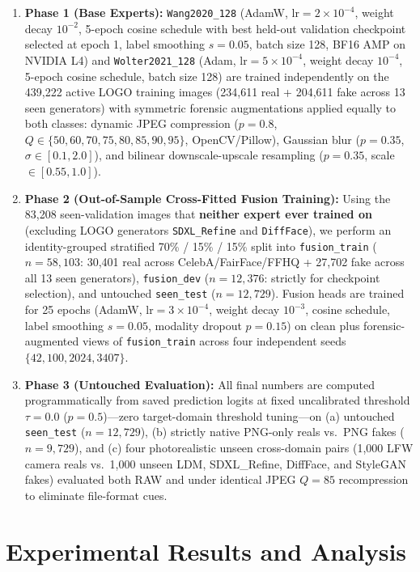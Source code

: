 \documentclass[fleqn,10pt]{wlscirep}
\begin{document}
\begin{enumerate}
    \item \textbf{Phase 1 (Base Experts):} \texttt{Wang2020\_128} (AdamW, $\text{lr}=2\times 10^{-4}$, weight decay $10^{-2}$, 5-epoch cosine schedule with best held-out validation checkpoint selected at epoch 1, label smoothing $s=0.05$, batch size 128, BF16 AMP on NVIDIA L4) and \texttt{Wolter2021\_128} (Adam, $\text{lr}=5\times 10^{-4}$, weight decay $10^{-4}$, 5-epoch cosine schedule, batch size 128) are trained independently on the 439,222 active LOGO training images (234,611 real + 204,611 fake across 13 seen generators) with symmetric forensic augmentations applied equally to both classes: dynamic JPEG compression ($p=0.8$, $Q\in\{50,60,70,75,80,85,90,95\}$, OpenCV/Pillow), Gaussian blur ($p=0.35$, $\sigma\in[0.1,2.0]$), and bilinear downscale-upscale resampling ($p=0.35$, scale $\in[0.55,1.0]$).
    \item \textbf{Phase 2 (Out-of-Sample Cross-Fitted Fusion Training):} Using the 83,208 seen-validation images that \textbf{neither expert ever trained on} (excluding LOGO generators \texttt{SDXL\_Refine} and \texttt{DiffFace}), we perform an identity-grouped stratified 70\% / 15\% / 15\% split into \texttt{fusion\_train} ($n=58,103$: 30,401 real across CelebA/FairFace/FFHQ + 27,702 fake across all 13 seen generators), \texttt{fusion\_dev} ($n=12,376$: strictly for checkpoint selection), and untouched \texttt{seen\_test} ($n=12,729$). Fusion heads are trained for 25 epochs (AdamW, $\text{lr}=3\times 10^{-4}$, weight decay $10^{-3}$, cosine schedule, label smoothing $s=0.05$, modality dropout $p=0.15$) on clean plus forensic-augmented views of \texttt{fusion\_train} across four independent seeds $\{42,100,2024,3407\}$.
    \item \textbf{Phase 3 (Untouched Evaluation):} All final numbers are computed programmatically from saved prediction logits at fixed uncalibrated threshold $\tau = 0.0$ ($p=0.5$)---zero target-domain threshold tuning---on (a) untouched \texttt{seen\_test} ($n=12,729$), (b) strictly native PNG-only reals vs.\ PNG fakes ($n=9,729$), and (c) four photorealistic unseen cross-domain pairs (1,000 LFW camera reals vs.\ 1,000 unseen LDM, SDXL\_Refine, DiffFace, and StyleGAN fakes) evaluated both RAW and under identical JPEG $Q=85$ recompression to eliminate file-format cues.
\end{enumerate}

\section*{Experimental Results and Analysis}
\end{document}
